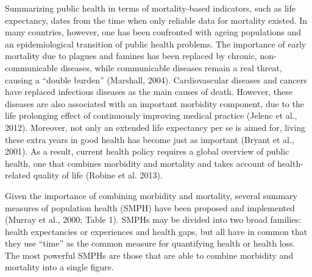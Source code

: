 \documentclass[]{book}
\begin{document}
Summarizing public health in terms of mortality-based indicators, such
as life expectancy, dates from the time when only reliable data for
mortality existed. In many countries, however, one has been confronted
with ageing populations and an epidemiological transition of public
health problems. The importance of early mortality due to plagues and
famines has been replaced by chronic, non-communicable diseases, while
communicable diseases remain a real threat, causing a ``double burden''
(Marshall, 2004). Cardiovascular diseases and cancers have replaced
infectious diseases as the main causes of death. However, these diseases
are also associated with an important morbidity component, due to the
life prolonging effect of continuously improving medical practice
(Jelenc et al., 2012). Moreover, not only an extended life expectancy
per se is aimed for, living these extra years in good health has become
just as important (Bryant et al., 2001). As a result, current health
policy requires a global overview of public health, one that combines
morbidity and mortality and takes account of health-related quality of
life (Robine et al. 2013).

Given the importance of combining morbidity and mortality, several
summary measures of population health (SMPH) have been proposed and
implemented (Murray et al., 2000; Table 1). SMPHs may be divided into
two broad families: health expectancies or experiences and health gaps,
but all have in common that they use ``time'' as the common measure for
quantifying health or health loss. The most powerful SMPHs are those
that are able to combine morbidity and mortality into a single figure.
\end{document}
